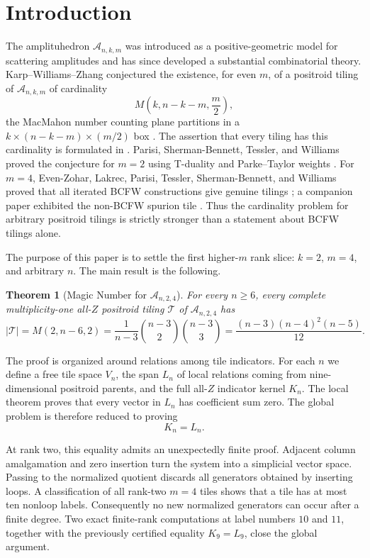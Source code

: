 \documentclass[11pt]{article}
\newtheorem{theorem}{Theorem}[section]
\newcommand{\A}{\mathcal A}
\newcommand{\1}{\mathbf 1}
\begin{document}
\section{Introduction}

The amplituhedron $\A_{n,k,m}$ was introduced as a positive-geometric model
for scattering amplitudes and has since developed a substantial
combinatorial theory.  Karp--Williams--Zhang conjectured the existence,
for even $m$, of a positroid tiling of $\A_{n,k,m}$ of cardinality
\[
M\!\left(k,n-k-m,\frac m2\right),
\]
the MacMahon number counting plane partitions in a
$k\times(n-k-m)\times(m/2)$ box \cite[Conjecture 8.1]{KWZ}.
The assertion that every tiling has this cardinality is formulated in
\cite[Conjecture 3.9]{GalashinLam}.  Parisi,
Sherman-Bennett, Tessler, and Williams proved the conjecture for $m=2$
using T-duality and Parke--Taylor weights \cite{M2Magic}.  For $m=4$,
Even-Zohar, Lakrec, Parisi, Tessler, Sherman-Bennett, and Williams proved
that all iterated BCFW constructions give genuine tilings
\cite{BCFWCluster}; a companion paper exhibited the non-BCFW spurion tile
\cite{ClusterResults}.  Thus the cardinality problem for arbitrary
positroid tilings is strictly stronger than a statement about BCFW
tilings alone.

The purpose of this paper is to settle the first higher-$m$ rank slice:
$k=2$, $m=4$, and arbitrary $n$.  The main result is the following.

\begin{theorem}[Magic Number for $\A_{n,2,4}$]\label{thm:main}
For every $n\ge 6$, every complete multiplicity-one all-$Z$ positroid
tiling $\mathcal T$ of $\A_{n,2,4}$ has
\[
|\mathcal T|
=M(2,n-6,2)
=\frac{1}{n-3}\binom{n-3}{2}\binom{n-3}{3}
=\frac{(n-3)(n-4)^2(n-5)}{12}.
\]
\end{theorem}

The proof is organized around relations among tile indicators.  For each
$n$ we define a free tile space $V_n$, the span $L_n$ of local relations
coming from nine-dimensional positroid parents, and the full all-$Z$
indicator kernel $K_n$.  The local theorem proves that every vector in
$L_n$ has coefficient sum zero.  The global problem is therefore reduced
to proving
\[
K_n=L_n.
\]

At rank two, this equality admits an unexpectedly finite proof.  Adjacent
column amalgamation and zero insertion turn the system into a simplicial
vector space.  Passing to the normalized quotient discards all generators
obtained by inserting loops.  A classification of all rank-two $m=4$
tiles shows that a tile has at most ten nonloop labels.  Consequently no
new normalized generators can occur after a finite degree.  Two exact
finite-rank computations at label numbers $10$ and $11$, together with the
previously certified equality $K_9=L_9$, close the global argument.
\end{document}
